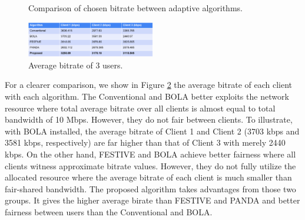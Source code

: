 \documentclass[journal]{IEEEtran}
\begin{document}
\begin{figure}[!h]
	\caption{Comparison of chosen bitrate between adaptive algorithms.}
	\label {Bitrate comp}
	
\end{figure} 
\begin{figure}[h]
	\centering
	
	\includegraphics[width=0.5\textwidth]{images/Rate3.png}
	
	
	
	\caption{Average bitrate of 3 users.}
	\label {Rate 3}
	
\end{figure} 
For a clearer comparison, we show in Figure \ref{Rate 3} the average bitrate of each client with each algorithm. The Conventional and BOLA better exploits the network resource where total average bitrate over all clients is almost equal to total bandwidth of 10 Mbps. However, they do not fair between clients. To illustrate, with BOLA installed, the average bitrate of Client 1 and Client 2 (3703 kbps and 
3581 kbps, respectively) are far higher than that of Client 3 with merely 2440 kbps. On the other hand, FESTIVE and BOLA achieve better fairness where all clients witness approximate bitrate values. However, they do not fully utilize the allocated resource where the average bitrate of each client is much smaller than fair-shared bandwidth. The proposed algorithm takes advantages from those two groups. It gives the higher average birate than FESTIVE and PANDA and better fairness between users than the Conventional and BOLA.
\end{document}
